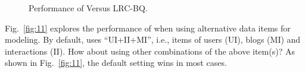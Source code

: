\begin{figure}
  \centering
  \caption{Performance of \sys{} Versus LRC-BQ.}
  \label{fig:10}
\end{figure}


Fig.\ \ref{fig:11} explores the performance of \sys{} when using alternative data items for modeling.
By default, \sys{} uses ``UI+II+MI'', i.e., items of users (UI), blogs (MI) and interactions (II).
How about using other combinations of the above item(s)?
As shown in Fig.\ \ref{fig:11}, the default setting wins in most cases.

